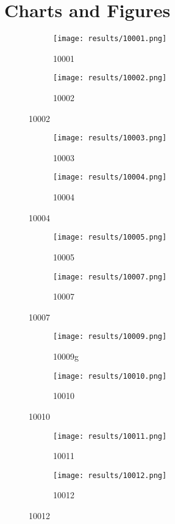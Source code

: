 \documentclass{article}
\begin{document}
\section{Charts and Figures}

\begin{figure}[!hbt]
\begin{subfigure}[!hbt]{0.5\linewidth}\texttt{[image: results/10001.png]}\caption{10001}\end{subfigure}
\begin{subfigure}[!hbt]{0.5\linewidth}\texttt{[image: results/10002.png]}\caption{10002}\end{subfigure}
\end{figure}
\begin{figure}[!hbt]
\begin{subfigure}[!hbt]{0.5\linewidth}\texttt{[image: results/10003.png]}\caption{10003}\end{subfigure}
\begin{subfigure}[!hbt]{0.5\linewidth}\texttt{[image: results/10004.png]}\caption{10004}\end{subfigure}
\end{figure}
\begin{figure}[!hbt]
\begin{subfigure}[!hbt]{0.5\linewidth}\texttt{[image: results/10005.png]}\caption{10005}\end{subfigure}
\begin{subfigure}[!hbt]{0.5\linewidth}\texttt{[image: results/10007.png]}\caption{10007}\end{subfigure}
\end{figure}
\begin{figure}[!hbt]
\begin{subfigure}[!hbt]{0.5\linewidth}\texttt{[image: results/10009.png]}\caption{10009g}\end{subfigure}
\begin{subfigure}[!hbt]{0.5\linewidth}\texttt{[image: results/10010.png]}\caption{10010}\end{subfigure}
\end{figure}
\begin{figure}[!hbt]
\begin{subfigure}[!hbt]{0.5\linewidth}\texttt{[image: results/10011.png]}\caption{10011}\end{subfigure}
\begin{subfigure}[!hbt]{0.5\linewidth}\texttt{[image: results/10012.png]}\caption{10012}\end{subfigure}
\end{figure}
\end{document}
